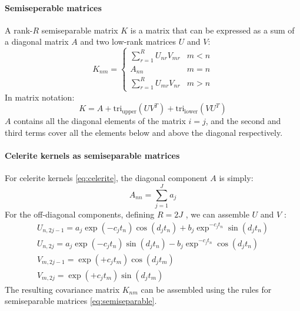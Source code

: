 \paragraph{Semiseperable matrices}
A rank-$R$ semiseparable matrix $K$ is a matrix that can be expressed as a sum of a diagonal matrix $A$ and two low-rank matrices $U$ and $V$:
\begin{equation} \label{eq:semiseparable-cases}
    K_{nm} = \begin{cases}
        \sum_{r=1}^R U_{nr} V_{mr} & m < n \\
        A_{nn} & m = n \\
        \sum_{r=1}^R U_{mr} V_{nr} & m > n
    \end{cases}
\end{equation}
In matrix notation:
\begin{equation} \label{eq:semiseparable-matrix}
    K = A + \text{tri}_{\text{upper}}(U V^T) + \text{tri}_{\text{lower}}(V U^T)
\end{equation}
$A$ contains all the diagonal elements of the matrix $i = j$, and the second and third terms cover all the elements below and above the diagonal respectively.

\paragraph{Celerite kernels as semiseparable matrices}
For celerite kernels \ref{eq:celerite}, the diagonal component $A$ is simply:
\begin{equation*}
    A_{nn} = \sum_{j=1}^J a_j
\end{equation*} \cite{foreman-mackay}
For the off-diagonal components, defining $R = 2J$ , we can assemble $U$ and $V$ \cite{foreman-mackay}:
\begin{equation*}
    \begin{aligned}
        U_{n, 2j-1} = a_j \exp (-c_j t_n) \cos(d_j t_n) + b_j \exp^{-c_j t_n} \sin(d_j t_n) \\
        U_{n, 2j} = a_j \exp (-c_j t_n) \sin(d_j t_n) - b_j \exp^{-c_j t_n} \cos(d_j t_n) \\
        V_{m, 2j-1} = \exp (+c_j t_m) \cos(d_j t_m) \\
        V_{m, 2j} = \exp (+c_j t_m) \sin(d_j t_m)
    \end{aligned}
\end{equation*} 
The resulting covariance matrix $K_{nm}$ can be assembled using the rules for semiseparable matrices \ref{eq:semiseparable}. 


